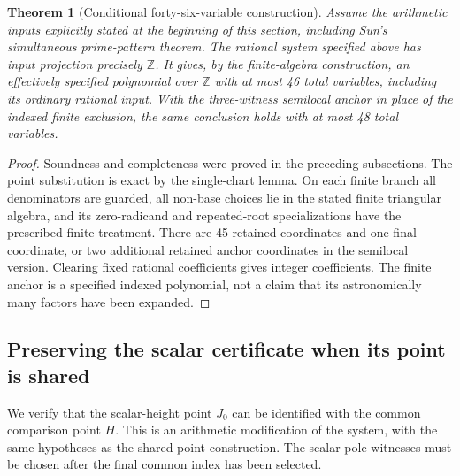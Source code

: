 \documentclass[11pt]{article}
\newtheorem{theorem}{Theorem}[section]
\theoremstyle{definition}
\begin{document}
\begin{theorem}[Conditional forty-six-variable construction]
Assume the arithmetic inputs explicitly stated at the beginning of
this section, including Sun's simultaneous prime-pattern theorem.
The rational system specified above has input projection precisely
$\mathbb Z$. It gives, by the finite-algebra construction, an
effectively specified polynomial over $\mathbb Z$ with at most
46 total variables, including its ordinary rational input. With the
three-witness semilocal anchor in place of the indexed finite exclusion,
the same conclusion holds with at most 48 total variables.
\end{theorem}
\begin{proof}
Soundness and completeness were proved in the preceding subsections.
The point substitution is exact by the single-chart lemma. On each
finite branch all denominators are guarded, all non-base choices lie
in the stated finite triangular algebra, and its zero-radicand and
repeated-root specializations have the prescribed finite treatment.
There are 45 retained coordinates and one final coordinate, or two
additional retained anchor coordinates in the semilocal version.
Clearing fixed rational coefficients gives integer coefficients.
The finite anchor is a specified indexed polynomial, not a claim that
its astronomically many factors have been expanded.
\end{proof}

\subsection{Preserving the scalar certificate when its point is shared}
\label{subsec:independent-height-sharing}

We verify that the scalar-height point $J_0$ can be identified with the
common comparison point $H$.  This is an arithmetic modification of the
system, with the same hypotheses as the shared-point construction.  The
scalar pole witnesses must be chosen after the final common index has
been selected.
\end{document}
